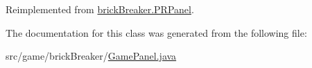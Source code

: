 Reimplemented from \hyperlink{classbrick_breaker_1_1_p_r_panel_ad077fab978f84663f366a6fdde5efe6c}{brickBreaker.PRPanel}.



The documentation for this class was generated from the following file:\begin{DoxyCompactItemize}
\item 
src/game/brickBreaker/\hyperlink{_game_panel_8java}{GamePanel.java}\end{DoxyCompactItemize}
